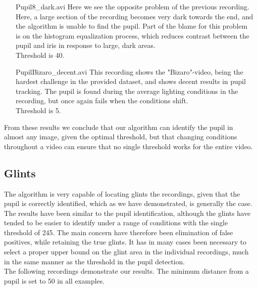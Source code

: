 \begin{itemize}
	\item[Pupil8\_dark.avi] Here we see the opposite problem of the previous recording. Here, a large section of the recording becomes very dark towards the end, and the algorithm is unable to find the pupil. Part of the blame for this problem is on the histogram equalization process, which reduces contrast between the pupil and iris in response to large, dark areas.\\Threshold is 40.
	\item[PupilBizaro\_decent.avi] This recording shows the "Bizaro"-video, being the hardest challenge in the provided dataset, and shows decent results in pupil tracking. The pupil is found during the average lighting conditions in the recording, but once again fails when the conditions shift.\\Threshold is 5.
\end{itemize}

From these results we conclude that our algorithm can identify the pupil in almost any image, given the optimal threshold, but that changing conditions throughout a video can ensure that no single threshold works for the entire video.

\subsection{Glints}
The algorithm is very capable of locating glints the recordings, given that the pupil is correctly identified, which as we have demonstrated, is generally the case. The results have been similar to the pupil identification, although the glints have tended to be easier to identify under a range of conditions with the single threshold of 245. The main concern have therefore been elimination of false positives, while retaining the true glints. It has in many cases been necessary to select a proper upper bound on the glint area in the individual recordings, much in the same manner as the threshold in the pupil detection.\\
The following recordings demonstrate our results. The minimum distance from a pupil is set to 50 in all examples.

